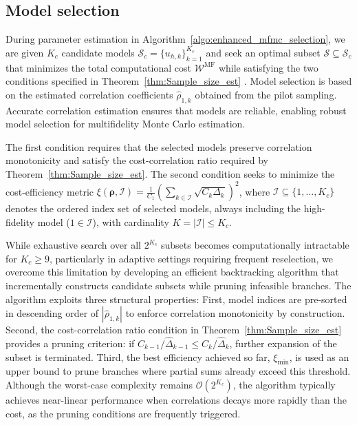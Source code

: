 

\subsection{Model selection}\label{sec:Model_Selection}


During parameter estimation in Algorithm~\ref{algo:enhanced_mfmc_selection}, we are given $K_c$ candidate models $\mathcal{S}_c = \{ u_{h,k} \}_{k=1}^{K_c}$ and seek an optimal subset $\mathcal{S} \subseteq \mathcal{S}_c$ that minimizes the total computational cost $\mathcal{W}^{\text{MF}}$ while satisfying the two conditions specified in Theorem~\ref{thm:Sample_size_est} \cite{PeWiGu:2016}. Model selection is based on the estimated correlation coefficients $\widehat{\rho}_{1,k}$ obtained from the pilot sampling. Accurate correlation estimation ensures that models are reliable, enabling robust model selection for multifidelity Monte Carlo estimation.  

The first condition requires that the selected models preserve correlation monotonicity and satisfy the cost-correlation ratio required by Theorem~\ref{thm:Sample_size_est}. The second condition seeks to minimize the cost-efficiency metric $\xi(\boldsymbol{\rho},\mathcal{I}) = \frac{1}{C_1}(\sum_{k \in \mathcal{I}} \sqrt{C_k \Delta_k})^2$, where $\mathcal{I} \subseteq \{1, \ldots, K_c\}$ denotes the ordered index set of selected models, always including the high-fidelity model ($1 \in \mathcal{I}$), with cardinality $K = |\mathcal{I}| \leq K_c$.

While exhaustive search over all $2^{K_c}$ subsets \cite{PeWiGu:2016} becomes computationally intractable for $K_c \geq 9$, particularly in adaptive settings requiring frequent reselection, we overcome this limitation by developing an efficient backtracking algorithm that incrementally constructs candidate subsets while pruning infeasible branches. The algorithm exploits three structural properties: First, model indices are pre-sorted in descending order of $|\widehat{\rho}_{1,k}|$  to enforce correlation monotonicity by construction. Second, the cost-correlation ratio condition in Theorem~\ref{thm:Sample_size_est} provides a pruning criterion: if $C_{k-1}/\widehat{\Delta}_{k-1} \leq C_k/\widehat{\Delta}_k$, further expansion of the subset is terminated. Third, the best efficiency achieved so far, $\xi_{\min}$, is used as an upper bound to prune branches where partial sums already exceed this threshold. Although the worst-case complexity remains $\mathcal{O}(2^{K_c})$, the algorithm typically achieves near-linear performance when correlations decays more rapidly than the cost, as the pruning conditions are frequently triggered.

